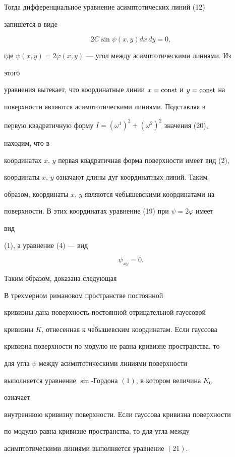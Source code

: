 Тогда дифференциальное уравнение асимптотических линий (12) 


запишется в виде 


$$ 


2C\sin\psi(x,y)dx\,dy=0, 


$$ 


где $\psi(x,y)=2\varphi(x,y)$ --- угол между асимптотическими линиями. Из 


этого 


уравнения вытекает, что координатные линии $x=\operatorname{const}$ и $y=\operatorname{const}$ на 


поверхности являются асимптотическими линиями. Подставляя в 


первую квадратичную форму $I=(\omega^1)^2+(\omega^2)^2$ значения (20), 


находим, что в 


координатах $x$, $y$ первая квадратичная форма поверхности имеет вид (2), 


координаты $x$, $y$ означают длины дуг координатных линий. Таким 


образом, координаты $x$, $y$ являются чебышевскими координатами на 


поверхности. В этих координатах уравнение (19) при $\psi=2\varphi$ имеет 


вид 


(1), а уравнение (4) --- вид 


\begin{equation} 


\psi_{x y}=0. 


\end{equation} 


Таким образом, доказана следующая 


 


\begin{thmnonum} 


В трехмерном римановом пространстве постоянной 


кривизны дана поверхность постоянной отрицательной гауссовой 


кривизны $K$, отнесенная к чебышевским координатам. Если гауссова 


кривизна поверхности по модулю не равна кривизне пространства, то 


для угла $\psi$ между асимптотическими линиями поверхности 


выполняется уравнение $\sin$-Гордона $(1)$, в котором величина $K_0$ 


означает 


внутреннюю кривизну поверхности. Если гауссова кривизна поверхности 


по модулю равна кривизне пространства, то для угла между 


асимптотическими линиями выполняется уравнение $(21)$. 


\end{thmnonum} 


